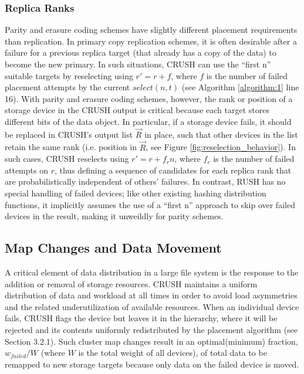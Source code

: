 \documentclass[12pt,a4paper]{report}
\begin{document}
\subsubsection{Replica Ranks}
Parity and erasure coding schemes have slightly different placement
requirements than replication. In primary copy replication schemes, it is often
desirable after a failure for a previous replica target (that already has a
copy of the data) to become the new primary. In such situations, CRUSH can use
the ``first n'' suitable targets by reselecting using $r' = r + f$, where $f$
is the number of failed placement attempts by the current $select(n,t)$ (see
Algorithm \ref{algorithm:1} line 16). With parity and erasure coding schemes,
however, the rank or position of a storage device in the CRUSH output is
critical because each target stores different bits of the data object. In
particular, if a storage device fails, it should be replaced in CRUSH’s output
list $\vec{R}$ in place, such that other devices in the list retain the same
rank (i.e. position in $\vec{R}$, see Figure \ref{fig:reselection_behavior}). In such cases, CRUSH reselects
using $r' = r + f_rn$, where $f_r$ is the number of failed attempts on $r$,
thus defining a sequence of candidates for each replica rank that are
probabilistically independent of others’ failures. In contrast, RUSH has no
special handling of failed devices; like other existing hashing distribution
functions, it implicitly assumes the use of a ``first n'' approach to skip over
failed devices in the result, making it unweildly for parity schemes.

\subsection{Map Changes and Data Movement}
A critical element of data distribution in a large file system is the response
to the addition or removal of storage resources. CRUSH maintains a uniform
distribution of data and workload at all times in order to avoid load
asymmetries and the related underutilization of available resources. When an
individual device fails, CRUSH flags the device but leaves it in the hierarchy,
where it will be rejected and its contents uniformly redistributed by the
placement algorithm (see Section 3.2.1). Such cluster map changes result in an
optimal(minimum) fraction, $w_{failed} / W$ (where $W$ is the total weight of
all devices), of total data to be remapped to new storage targets because only
data on the failed device is moved.
\end{document}
